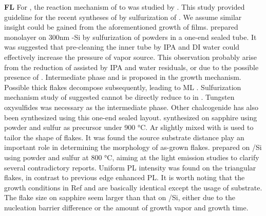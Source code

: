 \textbf{ FL} For , the reaction mechanism of  to  was studied by \citeauthor{Weber1996}.\cite{Weber1996} This study provided guideline for the recent syntheses of  by sulfurization of . \cite{Lin2012,Lee2012b,Liu2012a} We assume similar insight could be gained from the aforementioned growth of  films. \citeauthor{Cong2013} prepared monolayer  on 300nm -Si by sulfurization of  powders in a one-end sealed tube.\cite{Cong2013} It was suggested that pre-cleaning the inner tube by IPA and DI water could effectively increase the pressure of vapor source. This observation probably arise from the reduction of  assisted by IPA and water residuals, or due to the possible presence of . Intermediate phase  and  is proposed in the growth mechanism. Possible thick  flakes decompose subsequently, leading to ML . Sulfurization mechanism study of  suggested  cannot be directly reduce to  in .\cite{VanderVlies2002,VanderVlies2002a} Tungsten oxysulfides was necessary as the intermediate phase. Other chalcogenide has also been synthesized using this one-end sealed layout.\cite{Mukherjee2013} \citeauthor{Zhang2013h} synthesized  on sapphire using  powder and sulfur as precursor under 900 \si{\degreeCelsius}.  \cite{Zhang2013h} Ar slightly mixed with  is used to tailor the shape of  flakes. It was found the source substrate distance play an important role in determining the morphology of as-grown flakes. \citeauthor{Peimyoo2013} prepared  on /Si using  powder and sulfur at 800 \si{\degreeCelsius}, aiming at the light emission studies to clarify several contradictory reports.\cite{Peimyoo2013} Uniform PL intensity was found on the triangular  flakes, in contrast to previous edge enhanced PL.\cite{Berkdemir2013} It is worth noting that the growth conditions in Ref \cite{Peimyoo2013} and \cite{Zhang2013h} are basically identical except the usage of substrate. The flake size on sapphire seem larger than that on /Si, either due to the nucleation barrier difference or the amount of growth vapor and growth time.


